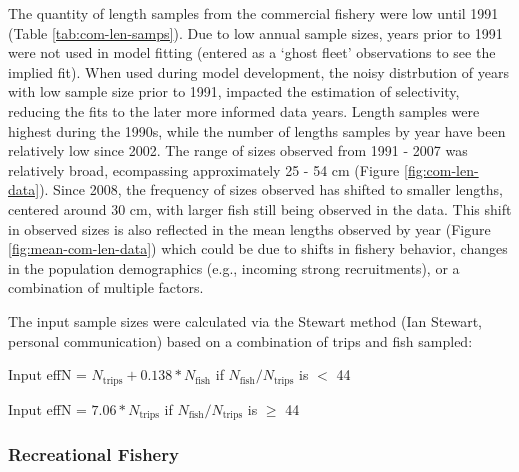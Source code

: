 \documentclass[11pt,
  english,
  a4paper,
]{article}
\begin{document}
The quantity of length samples from the commercial fishery were low until 1991 (Table \ref{tab:com-len-samps}). Due to low annual sample sizes, years prior to 1991 were not used in model fitting (entered as a `ghost fleet' observations to see the implied fit). When used during model development, the noisy distrbution of years with low sample size prior to 1991, impacted the estimation of selectivity, reducing the fits to the later more informed data years. Length samples were highest during the 1990s, while the number of lengths samples by year have been relatively low since 2002. The range of sizes observed from 1991 - 2007 was relatively broad, ecompassing approximately 25 - 54 cm (Figure \ref{fig:com-len-data}). Since 2008, the frequency of sizes observed has shifted to smaller lengths, centered around 30 cm, with larger fish still being observed in the data. This shift in observed sizes is also reflected in the mean lengths observed by year (Figure \ref{fig:mean-com-len-data}) which could be due to shifts in fishery behavior, changes in the population demographics (e.g., incoming strong recruitments), or a combination of multiple factors.

\leavevmode\tagmcend\tagstructend\par


The input sample sizes were calculated via the Stewart method (Ian Stewart, personal communication) based on a combination of trips and fish sampled:

\leavevmode\tagmcend\tagstructend\par

\begin{centering}

Input effN = $N_{\text{trips}} + 0.138 * N_{\text{fish}}$ if $N_{\text{fish}}/N_{\text{trips}}$ is $<$ 44

Input effN = $7.06 * N_{\text{trips}}$ if $N_{\text{fish}}/N_{\text{trips}}$ is $\geq$ 44

\end{centering}


\hypertarget{recreational-fishery}{%
\subsubsection{Recreational Fishery}\label{recreational-fishery}}

\leavevmode\tagmcend\tagstructend
\end{document}
